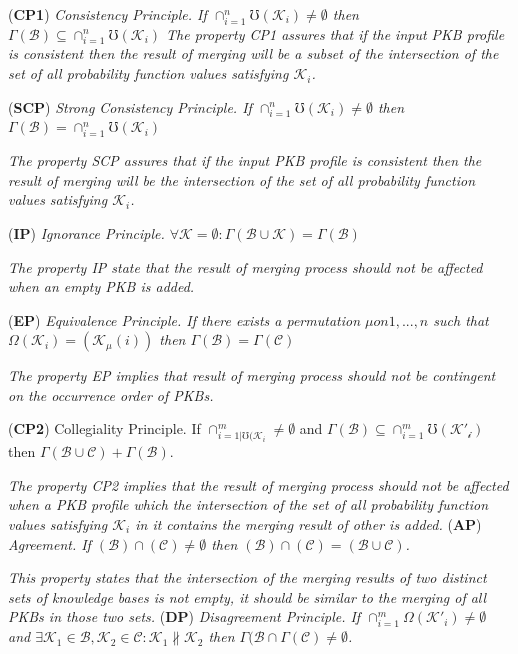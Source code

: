 \documentclass[]{iosart2c}
\begin{document}
  (\textbf{CP1}) \textit{Consistency Principle. If $\cap^n_{i=1}\mho(\mathcal{K}_i) \neq \emptyset$ then $\Gamma(\mathcal{B}) \subseteq \cap^n_{i=1}\mho(\mathcal{K}_i)$
    The property CP1 assures that if the input PKB profile is consistent then the result of merging will be a subset of the intersection of the set of all probability function values satisfying $\mathcal{K}_i$.}

  (\textbf{SCP}) \textit{Strong Consistency Principle. If $\cap^n_{i=1}\mho(\mathcal{K}_i) \neq \emptyset$ then $\Gamma(\mathcal{B}) = \cap^n_{i=1}\mho(\mathcal{K}_i)$}

  \textit{The property SCP assures that if the input PKB profile is consistent then the result of merging will be the intersection of the set of all probability function
  values satisfying $\mathcal{K}_i$.}

  (\textbf{IP}) \textit{Ignorance Principle. $\forall \mathcal{K} = \emptyset : \Gamma(\mathcal{B} \cup \mathcal{K}) = \Gamma(\mathcal{B})$}

  \textit{The property IP state that the result of merging process should not be affected when an empty PKB is added.}

  (\textbf{EP}) \textit{Equivalence Principle. If there exists a permutation $\mu on {1, ... , n}$ such that $\Omega(\mathcal{K}_i) = (\mathcal{K}_\mu(i))$ then $\Gamma(\mathcal{B}) =  \Gamma(\mathcal{C})$}

  \textit{The property EP implies that result of merging process should not be contingent on the occurrence order of PKBs.}

  (\textbf{CP2}) Collegiality Principle. If $\cap^m_{i=1|\mho(\mathcal{K}_i} \neq \emptyset$ and $\Gamma(\mathcal{B}) \subseteq \cap^m_{i=1}\mho(\mathcal{K'_i})$ then $\Gamma(\mathcal{B} \cup \mathcal{C}) + \Gamma(\mathcal{B})$.

  \textit{The property CP2 implies that the result of merging process should not be affected when a PKB profile which the intersection of the set of all probability function values satisfying $\mathcal{K}_i$ in it contains the merging result of other is added.
  }
  (\textbf{AP}) \textit{Agreement. If $(\mathcal{B}) \cap (\mathcal{C}) \neq \emptyset$ then $(\mathcal{B}) \cap (\mathcal{C}) = (\mathcal{B} \cup \mathcal{C})$.}

  \textit{This property states that the intersection of the merging results of two distinct sets of knowledge bases is not empty, it should be similar to the merging of all PKBs in those two sets.
  }
  (\textbf{DP}) \textit{Disagreement Principle. If $\cap^m_{i=1}\Omega(\mathcal{K}'_i) \neq \emptyset$ and $\exists \mathcal{K}_1 \in \mathcal{B}, \mathcal{K}_2 \in \mathcal{C}: \mathcal{K}_1 \nparallel \mathcal{K}_2$ then $\Gamma(\mathcal{B} \cap \Gamma(\mathcal{C}) \neq \emptyset$.}
\end{document}
